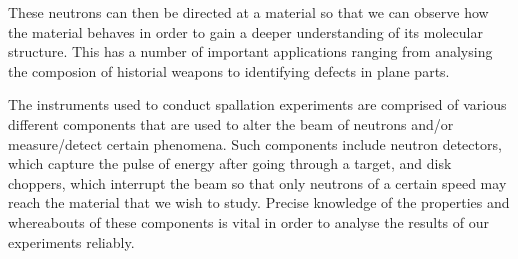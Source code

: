 These neutrons can then be directed at a material so that we can observe how the material behaves in order to gain a deeper understanding of its molecular structure. This has a number of important applications ranging from analysing the composion of historial weapons to identifying defects in plane parts.

The instruments used to conduct spallation experiments are comprised of various different components that are used to alter the beam of neutrons and/or measure/detect certain phenomena. Such components include neutron detectors, which capture the pulse of energy after going through a target, and disk choppers, which interrupt the beam so that only neutrons of a certain speed may reach the material that we wish to study. Precise knowledge of the properties and whereabouts of these components is vital in order to analyse the results of our experiments reliably. 
